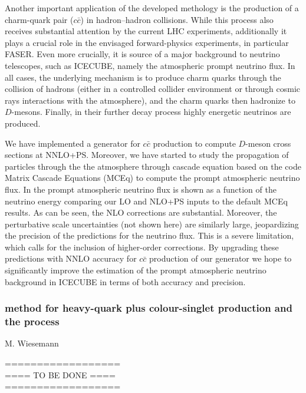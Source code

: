 \documentclass{FBR_Bericht_2025}
\begin{document}
\begin{refsection}
Another important application of the developed \minnlo{} methology is the production
of a charm-quark pair ($c\bar c$) 
in hadron--hadron collisions. While this process also receives
substantial attention by the current LHC experiments, additionally it plays a crucial role in 
the envisaged forward-physics experiments, in particular FASER. Even more crucially,
it is source of a major background to neutrino telescopes, such as ICECUBE, namely
the atmospheric prompt neutrino flux.
In all cases, the underlying mechanism is to produce charm quarks through the collision
of hadrons (either in a controlled collider environment or through cosmic rays interactions 
with the atmosphere), and the charm quarks then hadronize to $D$-mesons. Finally, in 
their further decay process highly energetic neutrinos are produced.

We have implemented a \minnlo{} generator for $c\bar c$ production to compute
$D$-meson cross sections at NNLO+PS. Moreover, we have started to study 
the propagation of particles through the the atmosphere through cascade equation
based on the code Matrix Cascade Equations (MCEq) \cite{} to compute the prompt
atmospheric neutrino flux. In  the prompt atmospheric neutrino
flux is shown as a function of the neutrino energy comparing our LO and NLO+PS
inputs to the default MCEq results. As can be seen, the NLO corrections are substantial.
Moreover, the perturbative scale uncertainties (not shown here) are similarly large, 
jeopardizing the precision of the predictions for the neutrino flux. 
This is a severe limitation, which calls for the inclusion of higher-order corrections.
By upgrading these predictions with NNLO accuracy for $c\bar c$ production of 
our \minnlo{} generator we hope to significantly improve the estimation of the 
prompt atmospheric neutrino background in ICECUBE in terms of both accuracy and
precision.


%
\subsubsection[\minnlo{} method for heavy-quark plus colour-singlet production and application to $b\bar{b}Z$ process]{\minnlo{} method for heavy-quark plus colour-singlet production and the  process}
\begin{Namen}
M. Wiesemann
\end{Namen}
%
{\color{red} ==================\\ ====\; TO BE DONE\; ====\\ ==================}
%

\end{refsection}
\end{document}
